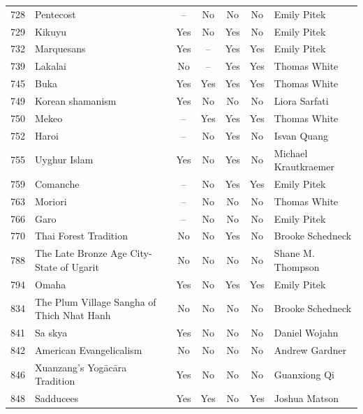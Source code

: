{\begin{longtable}{rp{3.5cm}ccccp{3cm}}
728 & {\raggedright Pentecost} & -- & No & No & No & {\raggedright Emily Pitek} \\
729 & {\raggedright Kikuyu} & Yes & No & Yes & No & {\raggedright Emily Pitek} \\
732 & {\raggedright Marquesans} & Yes & -- & Yes & Yes & {\raggedright Emily Pitek} \\
739 & {\raggedright Lakalai} & No & -- & Yes & Yes & {\raggedright Thomas White} \\
745 & {\raggedright Buka} & Yes & Yes & Yes & Yes & {\raggedright Thomas White} \\
749 & {\raggedright Korean shamanism} & Yes & No & No & No & {\raggedright Liora Sarfati} \\
750 & {\raggedright Mekeo} & -- & Yes & Yes & Yes & {\raggedright Thomas White} \\
752 & {\raggedright Haroi} & -- & No & Yes & No & {\raggedright Isvan Quang} \\
755 & {\raggedright Uyghur Islam} & Yes & No & Yes & No & {\raggedright Michael Krautkraemer} \\
759 & {\raggedright Comanche} & -- & No & Yes & Yes & {\raggedright Emily Pitek} \\
763 & {\raggedright Moriori} & -- & No & No & No & {\raggedright Thomas White} \\
766 & {\raggedright Garo} & -- & No & No & No & {\raggedright Emily Pitek} \\
770 & {\raggedright Thai Forest Tradition} & No & No & Yes & No & {\raggedright Brooke Schedneck} \\
788 & {\raggedright The Late Bronze Age City-State of Ugarit} & No & No & No & No & {\raggedright Shane M. Thompson} \\
794 & {\raggedright Omaha} & Yes & No & Yes & Yes & {\raggedright Emily Pitek} \\
834 & {\raggedright The Plum Village Sangha of Thich Nhat Hanh} & No & No & No & No & {\raggedright Brooke Schedneck} \\
841 & {\raggedright Sa skya} & Yes & No & No & No & {\raggedright Daniel Wojahn} \\
842 & {\raggedright American Evangelicalism} & No & No & No & No & {\raggedright Andrew Gardner} \\
846 & {\raggedright Xuanzang's Yogācāra Tradition} & Yes & No & No & No & {\raggedright Guanxiong Qi} \\
848 & {\raggedright Sadducees} & Yes & Yes & No & Yes & {\raggedright Joshua Matson} \\

\end{longtable}}
